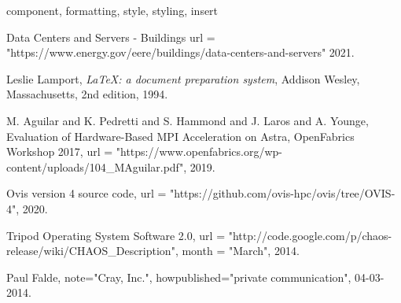 \documentclass[conference]{IEEEtran}
\begin{document}
\begin{IEEEkeywords}
component, formatting, style, styling, insert
\end{IEEEkeywords}







%

\begin{thebibliography}{10}

  Data Centers and Servers - Buildings
  url = "https://www.energy.gov/eere/buildings/data-centers-and-servers"
  2021.
  
  Leslie Lamport,
  \textit{\LaTeX: a document preparation system},
  Addison Wesley, Massachusetts, 
  2nd edition,
  1994.

  M. Aguilar and K. Pedretti and S. Hammond and J. Laros and A. Younge,
  {E}valuation of {H}ardware-{B}ased {MPI} {A}cceleration on {A}stra,
  {O}pen{F}abrics {W}orkshop 2017,
  url = "https://www.openfabrics.org/wp-content/uploads/104{\_}MAguilar.pdf",
  2019.

  {O}vis version 4 source code,
  url = "https://github.com/ovis-hpc/ovis/tree/OVIS-4",
  2020.

  {T}ripod {O}perating {S}ystem {S}oftware 2.0,
  url = "http://code.google.com/p/chaos-release/wiki/CHAOS_Description",
  month = "March",
  2014.

  Paul Falde,
  note="{Cray, Inc.}",
  howpublished="private communication",
  04-03-2014.


\end{thebibliography}
\end{document}
